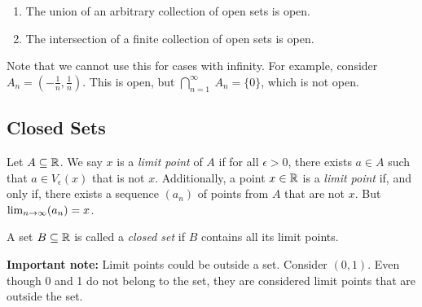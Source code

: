 \begin{theorem}
    \begin{enumerate}[label=(\roman*)]
        \item The union of an arbitrary collection of open sets is open.
        \item The intersection of a finite collection of open sets is open. 
    \end{enumerate}
\end{theorem}


Note that we cannot use this for cases with infinity. For example, consider \(A_n = (-\frac{1}{n}, \frac{1}{n})\). This is open, but \(\bigcap_{n = 1}^\infty\ A_n = \{0\}\), which is not open. 

\subsection{Closed Sets}

\begin{definition}
    Let \(A \subseteq \mathbb{R}\). We say \(x\) is a \textit{limit point} of \(A\) if for all \(\epsilon > 0\), there exists \(a \in A\) such that \(a \in V_\epsilon(x)\) that is not \(x\). Additionally, a point \(x \in \mathbb{R}\) is a \textit{limit point} if, and only if, there exists a sequence \((a_n)\) of points from \(A\) that are not \(x\). But \(\lim_{n \rightarrow \infty}(a_n) = x\). 
\end{definition}

\begin{definition}
    A set \(B \subseteq \mathbb{R}\) is called a \textit{closed set} if \(B\) contains all its limit points. 
\end{definition}

\begin{note}
    \textbf{Important note:} Limit points could be outside a set. Consider \((0,1)\). Even though 0 and 1 do not belong to the set, they are considered limit points that are outside the set.
\end{note}

